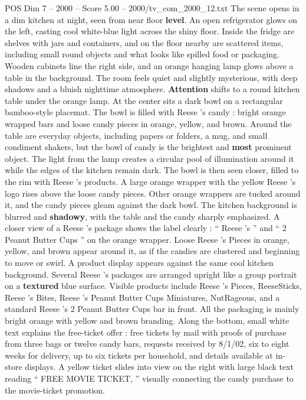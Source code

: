 \begin{textsample}{POS Dim 7 – 2000 – Score 5.00 – 2000/tv\_com\_2000\_12.txt}  \label{ex:f7_pos_078}
The scene opens in a dim kitchen at night, seen from near floor \textbf{level}.
An open refrigerator glows on the left, casting cool white-blue light across the shiny floor.
Inside the fridge are shelves with jars and containers, and on the floor nearby are scattered items, including small round objects and what looks like spilled food or packaging.
Wooden cabinets line the right side, and an orange hanging lamp glows above a table in the background.
The room feels quiet and slightly mysterious, with deep shadows and a bluish nighttime atmosphere. \textbf{Attention} shifts to a round kitchen table under the orange lamp.
At the center sits a dark bowl on a rectangular bamboo-style placemat.
The bowl is filled with Reese ’s candy : bright orange wrapped bars and loose candy pieces in orange, yellow, and brown.
Around the table are everyday objects, including papers or folders, a mug, and small condiment shakers, but the bowl of candy is the brightest and \textbf{most} prominent object.
The light from the lamp creates a circular pool of illumination around it while the edges of the kitchen remain dark.
The bowl is then seen closer, filled to the rim with Reese ’s products.
A large orange wrapper with the yellow Reese ’s logo rises above the loose candy pieces.
Other orange wrappers are tucked around it, and the candy pieces gleam against the dark bowl.
The kitchen background is blurred and \textbf{shadowy}, with the table and the candy sharply emphasized.
A closer view of a Reese ’s package shows the label clearly : “ Reese ’s ” and “ 2 Peanut Butter Cups ” on the orange wrapper.
Loose Reese ’s Pieces in orange, yellow, and brown appear around it, as if the candies are clustered and beginning to move or swirl.
A product display appears against the same cool kitchen background.
Several Reese ’s packages are arranged upright like a group portrait on a \textbf{textured} blue surface.
Visible products include Reese ’s Pieces, ReeseSticks, Reese ’s Bites, Reese ’s Peanut Butter Cups Miniatures, NutRageous, and a standard Reese ’s 2 Peanut Butter Cups bar in front.
All the packaging is mainly bright orange with yellow and brown branding.
Along the bottom, small white text explains the free-ticket offer : free tickets by mail with proofs of purchase from three bags or twelve candy bars, requests received by 8/1/02, six to eight weeks for delivery, up to six tickets per household, and details available at in-store displays.
A yellow ticket slides into view on the right with large black text reading “ FREE MOVIE TICKET, ” visually connecting the candy purchase to the movie-ticket promotion.

\end{textsample}
